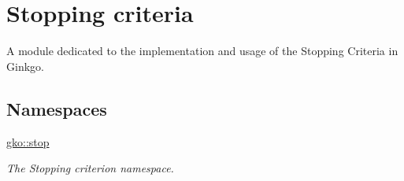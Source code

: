 \hypertarget{group__stop}{}\section{Stopping criteria}
\label{group__stop}


A module dedicated to the implementation and usage of the Stopping Criteria in Ginkgo.  


\subsection*{Namespaces}
\begin{DoxyCompactItemize}
\item 
 \hyperlink{namespacegko_1_1stop}{gko\+::stop}
\begin{DoxyCompactList}\small\item\em The Stopping criterion namespace. \end{DoxyCompactList}\end{DoxyCompactItemize}
